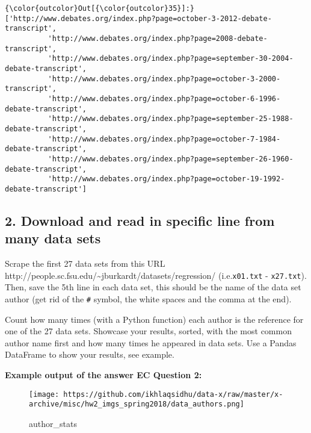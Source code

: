 \documentclass[11pt]{article}
\makeatletter
\def\maxwidth{\ifdim\Gin@nat@width>\linewidth\linewidth
    \else\Gin@nat@width\fi}
\let\Oldincludegraphics\includegraphics
\renewcommand{\includegraphics}[1]{\Oldincludegraphics[width=.8\maxwidth]{#1}}
\makeatother
\begin{document}
\begin{Verbatim}[commandchars=\\\{\}]
{\color{outcolor}Out[{\color{outcolor}35}]:} ['http://www.debates.org/index.php?page=october-3-2012-debate-transcript',
          'http://www.debates.org/index.php?page=2008-debate-transcript',
          'http://www.debates.org/index.php?page=september-30-2004-debate-transcript',
          'http://www.debates.org/index.php?page=october-3-2000-transcript',
          'http://www.debates.org/index.php?page=october-6-1996-debate-transcript',
          'http://www.debates.org/index.php?page=september-25-1988-debate-transcript',
          'http://www.debates.org/index.php?page=october-7-1984-debate-transcript',
          'http://www.debates.org/index.php?page=september-26-1960-debate-transcript',
          'http://www.debates.org/index.php?page=october-19-1992-debate-transcript']
\end{Verbatim}
            
    \hypertarget{download-and-read-in-specific-line-from-many-data-sets}{%
\subsection{2. Download and read in specific line from many data
sets}\label{download-and-read-in-specific-line-from-many-data-sets}}

Scrape the first 27 data sets from this URL
http://people.sc.fsu.edu/\textasciitilde{}jburkardt/datasets/regression/
(i.e.\texttt{x01.txt} - \texttt{x27.txt}). Then, save the 5th line in
each data set, this should be the name of the data set author (get rid
of the \texttt{\#} symbol, the white spaces and the comma at the end).

Count how many times (with a Python function) each author is the
reference for one of the 27 data sets. Showcase your results, sorted,
with the most common author name first and how many times he appeared in
data sets. Use a Pandas DataFrame to show your results, see example.

\textbf{Example output of the answer EC Question 2:}

\begin{figure}
\centering
\texttt{[image: https://github.com/ikhlaqsidhu/data-x/raw/master/x-archive/misc/hw2\_imgs\_spring2018/data\_authors.png]}
\caption{author\_stats}
\end{figure}


    
    
    
    
\end{document}
